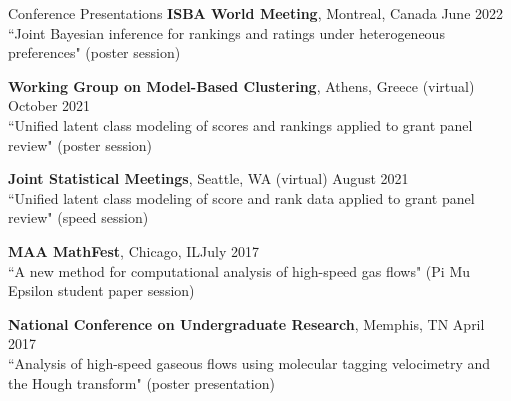 \documentclass{resume} %
\begin{document}
\begin{rSection}{Conference Presentations}
\textbf{ISBA World Meeting}, Montreal, Canada \hfill {June 2022}\\
``Joint Bayesian inference for rankings and ratings under heterogeneous preferences" (poster session)

\textbf{Working Group on Model-Based Clustering}, Athens, Greece (virtual)  \hfill {October 2021}\\
``Unified latent class modeling of scores and rankings applied to grant panel review" (poster session)

\textbf{Joint Statistical Meetings}, Seattle, WA (virtual) \hfill {August 2021}\\
``Unified latent class modeling of score and rank data applied to grant panel review" (speed session)

\textbf{MAA MathFest}, Chicago, IL\hfill {July 2017}\\
``A new method for computational analysis of high-speed gas flows" (Pi Mu Epsilon student paper session)

\textbf{National Conference on Undergraduate Research}, Memphis, TN \hfill {April 2017}\\
``Analysis of high-speed gaseous flows using molecular tagging velocimetry and the Hough transform" (poster presentation)

\end{rSection}





\end{document}
